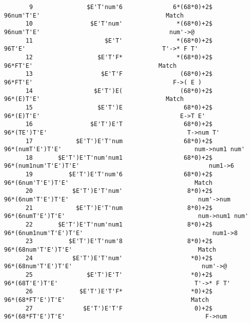 \documentclass[UTF8]{ctexart}
\begin{document}
\begin{lstlisting}
       9               $E'T'num'6              6*(68*0)+2$                             96num'T'E'                                   Match
      10                $E'T'num'               *(68*0)+2$                            96num'T'E'                                    num'->@
      11                    $E'T'               *(68*0)+2$                            96T'E'                                      T'->* F T'
      12                  $E'T'F*               *(68*0)+2$                            96*FT'E'                                   Match
      13                   $E'T'F                (68*0)+2$                           96*FT'E'                                       F->( E )
      14                 $E'T')E(                (68*0)+2$                           96*(E)T'E'                                   Match
      15                  $E'T')E                 68*0)+2$                          96*(E)T'E'                                       E->T E'
      16                $E'T')E'T                 68*0)+2$                          96*(TE')T'E'                                       T->num T'
      17            $E'T')E'T'num                 68*0)+2$                          96*(numT'E')T'E'                                     num->num1 num'
      18       $E'T')E'T'num'num1                 68*0)+2$                          96*(num1num'T'E')T'E'                                    num1->6
      19          $E'T')E'T'num'6                 68*0)+2$                          96*(6num'T'E')T'E'                                   Match
      20           $E'T')E'T'num'                  8*0)+2$                         96*(6num'T'E')T'E'                                    num'->num
      21            $E'T')E'T'num                  8*0)+2$                         96*(6numT'E')T'E'                                     num->num1 num'
      22       $E'T')E'T'num'num1                  8*0)+2$                         96*(6num1num'T'E')T'E'                                    num1->8
      23          $E'T')E'T'num'8                  8*0)+2$                         96*(68num'T'E')T'E'                                   Match
      24           $E'T')E'T'num'                   *0)+2$                        96*(68num'T'E')T'E'                                    num'->@
      25               $E'T')E'T'                   *0)+2$                        96*(68T'E')T'E'                                      T'->* F T'
      26             $E'T')E'T'F*                   *0)+2$                        96*(68*FT'E')T'E'                                   Match
      27              $E'T')E'T'F                    0)+2$                       96*(68*FT'E')T'E'                                       F->num

\end{lstlisting}
\end{document}
